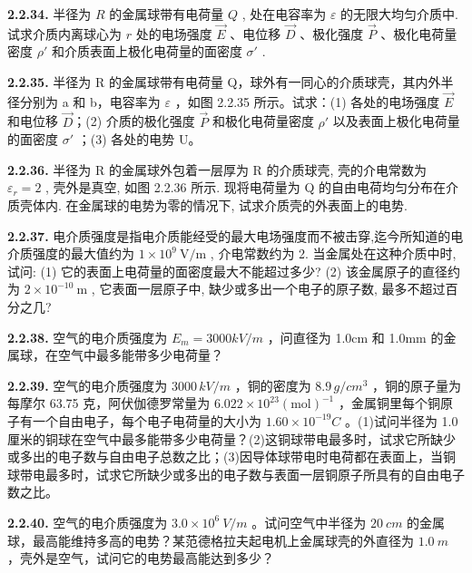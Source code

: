 \vfill
\newpage

\textbf{2.2.34.} 半径为 $R$ 的金属球带有电荷量 $Q$ , 处在电容率为 $\varepsilon$ 的无限大均匀介质中. 试求介质内离球心为 $r$ 处的电场强度 $\vec{E}$ 、电位移 $\vec{D}$ 、极化强度 $\vec{P}$ 、极化电荷量密度 $\rho'$ 和介质表面上极化电荷量的面密度 $\sigma'$ .

\vfill
\newpage

\textbf{2.2.35.} 半径为 R 的金属球带有电荷量 Q，球外有一同心的介质球壳，其内外半径分别为 a 和 b，电容率为 $\varepsilon$ ，如图 2.2.35 所示。试求：(1) 各处的电场强度 $\vec{E}$ 和电位移 $\vec{D}$；(2) 介质的极化强度 $\vec{P}$ 和极化电荷量密度 $\rho'$ 以及表面上极化电荷量的面密度 $\sigma'$ ；(3) 各处的电势 U。

\vfill
\newpage

\textbf{2.2.36.} 半径为 R 的金属球外包着一层厚为 R 的介质球壳, 壳的介电常数为 $\varepsilon_{r}=2$ , 壳外是真空, 如图 2.2.36 所示. 现将电荷量为 Q 的自由电荷均匀分布在介质壳体内. 在金属球的电势为零的情况下, 试求介质壳的外表面上的电势.

\vfill
\newpage

\textbf{2.2.37.} 电介质强度是指电介质能经受的最大电场强度而不被击穿,迄今所知道的电介质强度的最大值约为 $1 \times 10^{9} \mathrm{~V} / \mathrm{m}$ , 介电常数约为 2. 当金属处在这种介质中时,试问: (1) 它的表面上电荷量的面密度最大不能超过多少? (2) 该金属原子的直径约为 $2 \times 10^{-10} \mathrm{~m}$ , 它表面一层原子中, 缺少或多出一个电子的原子数, 最多不超过百分之几?

\vfill
\newpage

\textbf{2.2.38.} 空气的电介质强度为 $E_{m}=3000kV/m$ ，问直径为 1.0cm 和 1.0mm 的金属球，在空气中最多能带多少电荷量？

\vfill
\newpage

\textbf{2.2.39.} 空气的电介质强度为 $3000 \, kV/m$ ，铜的密度为 $8.9 \, g/cm^{3}$ ，铜的原子量为每摩尔 63.75 克，阿伏伽德罗常量为 $6.022 \times 10^{23} (\text{mol})^{-1}$ ，金属铜里每个铜原子有一个自由电子，每个电子电荷量的大小为 $1.60 \times 10^{-19} C$ 。(1)试问半径为 1.0 厘米的铜球在空气中最多能带多少电荷量？(2)这铜球带电最多时，试求它所缺少或多出的电子数与自由电子总数之比；(3)因导体球带电时电荷都在表面上，当铜球带电最多时，试求它所缺少或多出的电子数与表面一层铜原子所具有的自由电子数之比。

\vfill
\newpage

\textbf{2.2.40.} 空气的电介质强度为 $3.0 \times 10^{6} ~V/m$ 。试问空气中半径为 $20 ~cm$ 的金属球，最高能维持多高的电势？某范德格拉夫起电机上金属球壳的外直径为 $1.0 ~m$ ，壳外是空气，试问它的电势最高能达到多少？

